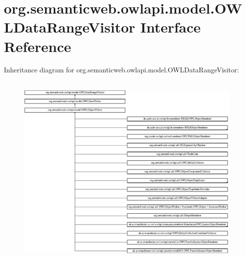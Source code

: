 \hypertarget{interfaceorg_1_1semanticweb_1_1owlapi_1_1model_1_1_o_w_l_data_range_visitor}{\section{org.\-semanticweb.\-owlapi.\-model.\-O\-W\-L\-Data\-Range\-Visitor Interface Reference}
\label{interfaceorg_1_1semanticweb_1_1owlapi_1_1model_1_1_o_w_l_data_range_visitor}
}
Inheritance diagram for org.\-semanticweb.\-owlapi.\-model.\-O\-W\-L\-Data\-Range\-Visitor\-:\begin{figure}[H]
\begin{center}
\leavevmode
\includegraphics[height=9.851851cm]{interfaceorg_1_1semanticweb_1_1owlapi_1_1model_1_1_o_w_l_data_range_visitor}
\end{center}
\end{figure}
